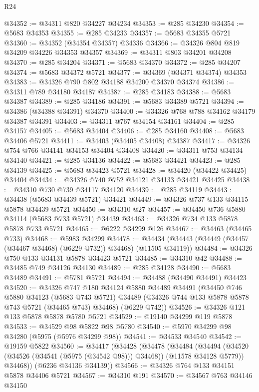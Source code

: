 \begin{lexlean}{R24}
\begin{coremodule}
@34352 := @34311 @820 @34227 @34234
@34353 := @285 @34230
@34354 := @5683 @34353
@34355 := @285 @34233
@34357 := @5683 @34355 @5721
@34360 := @34352 (@34354 @34357) @34336
@34366 := @34326 @804 @819 @34209 @34226 @34353 @34357
@34369 := @34311 @803 @34201 @34208
@34370 := @285 @34204
@34371 := @5683 @34370
@34372 := @285 @34207
@34374 := @5683 @34372 @5721
@34377 := @34369 (@34371 @34374) @34353
@34383 := @34326 @790 @802 @34188 @34200 @34370 @34374
@34386 := @34311 @789 @34180 @34187
@34387 := @285 @34183
@34388 := @5683 @34387
@34389 := @285 @34186
@34391 := @5683 @34389 @5721
@34394 := @34386 (@34388 @34391) @34370
@34400 := @34326 @768 @788 @34162 @34179 @34387 @34391
@34403 := @34311 @767 @34154 @34161
@34404 := @285 @34157
@34405 := @5683 @34404
@34406 := @285 @34160
@34408 := @5683 @34406 @5721
@34411 := @34403 (@34405 @34408) @34387
@34417 := @34326 @754 @766 @34141 @34153 @34404 @34408
@34420 := @34311 @753 @34134 @34140
@34421 := @285 @34136
@34422 := @5683 @34421
@34423 := @285 @34139
@34425 := @5683 @34423 @5721
@34428 := @34420 (@34422 @34425) @34404
@34434 := @34326 @740 @752 @34121 @34133 @34421 @34425
@34438 := @34310 @730 @739 @34117 @34120
@34439 := @285 @34119
@34443 := @34438 (@5683 @34439 @5721) @34421
@34449 := @34326 @737 @133 @34115 @5878 @34439 @5721
@34450 := @34310 @27
@34457 := @34450 @736 @5880 @34114 (@5683 @733 @5721) @34439
@34463 := @34326 @734 @133 @5878 @5878 @733 @5721
@34465 := @6222 @34299 @126
@34467 := @34463 (@34465 @733)
@34468 := @5983 @34299
@34478 := @34434 (@34443 (@34449 (@34457 (@34467 @34468) (@6229 @732)) @34468) (@11505 @34119))
@34484 := @34326 @750 @133 @34131 @5878 @34423 @5721
@34485 := @34310 @42
@34488 := @34485 @749 @34126 @34130
@34489 := @285 @34128
@34490 := @5683 @34489
@34491 := @5781 @5721
@34494 := @34488 (@34490 @34491) @34423
@34520 := @34326
    @747
    @180
    @34124
    @5880
    @34489
    @34491
    (@34450
      @746
      @5880
      @34123
      (@5683 @743 @5721)
      @34489
      (@34326 @744 @133 @5878 @5878 @743 @5721 (@34465 @743) @34468)
      (@6229 @742))
@34526 := @34326 @121 @133 @5878 @5878 @5780 @5721
@34529 := @19140 @34299 @119 @5878
@34533 := @34529 @98 @5822 @98 @5780
@34540 := @5970 @34299 @98 @34280 (@5975 (@5976 @34299 @98))
@34541 := @34533 @34540
@34542 := @19159 @5822
@34560 := @34417
    (@34428
      (@34478
        (@34484
          (@34494 (@34520 (@34526 (@34541 (@5975 (@34542 @98))) @34468)) (@11578 @34128 @5779))
          @34468))
      (@6236 @34136 @34139))
@34566 := @34326 @764 @133 @34151 @5878 @34406 @5721
@34567 := @34310 @191
@34570 := @34567 @763 @34146 @34150

\end{coremodule}
\end{lexlean}
